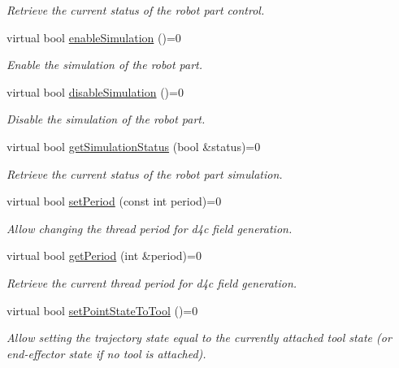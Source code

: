 \begin{DoxyCompactItemize}
\begin{DoxyCompactList}\small\item\em Retrieve the current status of the robot part control. \end{DoxyCompactList}\item 
virtual bool \hyperlink{classiCub_1_1d4c_1_1D4C_a182d7535cc875bccbd8044aa2cc075c3}{enable\+Simulation} ()=0
\begin{DoxyCompactList}\small\item\em Enable the simulation of the robot part. \end{DoxyCompactList}\item 
virtual bool \hyperlink{classiCub_1_1d4c_1_1D4C_ac735547b8b00778bb523ac0e2a9acdf4}{disable\+Simulation} ()=0
\begin{DoxyCompactList}\small\item\em Disable the simulation of the robot part. \end{DoxyCompactList}\item 
virtual bool \hyperlink{classiCub_1_1d4c_1_1D4C_a4dab04b8c61043f2b2734b3604ecd527}{get\+Simulation\+Status} (bool \&status)=0
\begin{DoxyCompactList}\small\item\em Retrieve the current status of the robot part simulation. \end{DoxyCompactList}\item 
virtual bool \hyperlink{classiCub_1_1d4c_1_1D4C_af9d4211503ab1a3ae73b00e16b731108}{set\+Period} (const int period)=0
\begin{DoxyCompactList}\small\item\em Allow changing the thread period for d4c field generation. \end{DoxyCompactList}\item 
virtual bool \hyperlink{classiCub_1_1d4c_1_1D4C_a68985c5667ecf81a0990218f4edd441a}{get\+Period} (int \&period)=0
\begin{DoxyCompactList}\small\item\em Retrieve the current thread period for d4c field generation. \end{DoxyCompactList}\item 
virtual bool \hyperlink{classiCub_1_1d4c_1_1D4C_a8ee6a9df7d60fa176b44e06b14cf8247}{set\+Point\+State\+To\+Tool} ()=0
\begin{DoxyCompactList}\small\item\em Allow setting the trajectory state equal to the currently attached tool state (or end-\/effector state if no tool is attached). \end{DoxyCompactList}\item 

\end{DoxyCompactItemize}

